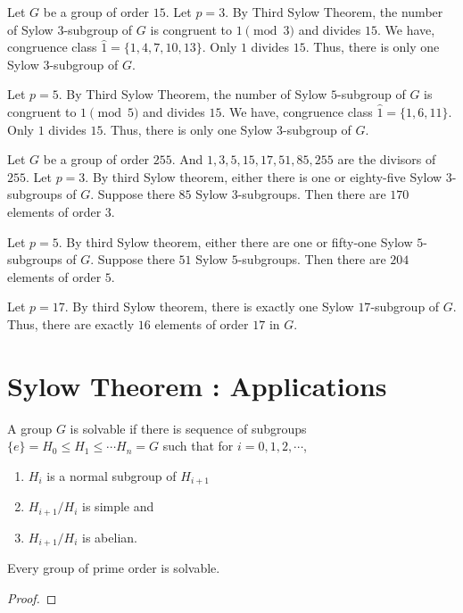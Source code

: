 \begin{remark}
	Let $G$ be a group of order $15$.
	Let $p = 3$.
	By Third Sylow Theorem, the number of Sylow $3$-subgroup of $G$ is congruent to $1 \pmod{3}$ and divides $15$.
	We have, congruence class $\hat{1} = \{ 1,4,7,10,13 \}$.
	Only $1$ divides $15$.
	Thus, there is only one Sylow $3$-subgroup of $G$.

	Let $p = 5$.
	By Third Sylow Theorem, the number of Sylow $5$-subgroup of $G$ is congruent to $1 \pmod{5}$ and divides $15$.
	We have, congruence class $\hat{1} = \{ 1,6,11 \}$.
	Only $1$ divides $15$.
	Thus, there is only one Sylow $3$-subgroup of $G$.
\end{remark}

\begin{remark}
	Let $G$ be a group of order $255$.
	And $1,3,5,15,17,51,85,255$ are the divisors of $255$.
	Let $p = 3$.
	By third Sylow theorem, either there is one or eighty-five Sylow $3$-subgroups of $G$.
	Suppose there $85$ Sylow $3$-subgroups. Then there are $170$ elements of order $3$.
	
	Let $p = 5$.
	By third Sylow theorem, either there are one or fifty-one Sylow $5$-subgroups of $G$.	
	Suppose there $51$ Sylow $5$-subgroups. Then there are $204$ elements of order $5$.

	Let $p = 17$.
	By third Sylow theorem, there is exactly one Sylow $17$-subgroup of $G$.	Thus, there are exactly $16$ elements of order $17$ in $G$.
\end{remark}

\section{Sylow Theorem : Applications}
\begin{definition}
	A group $G$ is solvable if there is sequence of subgroups $\{e\} = H_0 \le H_1 \le \cdots H_n = G$ such that for $i = 0,1,2,\cdots$,
	\begin{enumerate}
		\item $H_i$ is a normal subgroup of $H_{i+1}$
		\item $H_{i+1}/H_i$ is simple and
		\item $H_{i+1}/H_i$ is abelian.
	\end{enumerate}
\end{definition}

\begin{theorem}
	Every group of prime order is solvable.
\end{theorem}
\begin{proof}
\end{proof}

